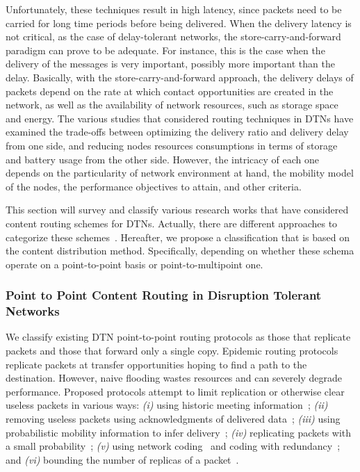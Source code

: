 Unfortunately, these techniques result in high latency, since packets need to be carried for long time periods before being delivered. When the delivery latency is not critical, as
the case of delay-tolerant networks, the store-carry-and-forward paradigm can prove to be adequate. For instance, this is the case when the delivery of the messages is very important, possibly more important than the delay. Basically, with the store-carry-and-forward approach, the delivery delays of packets depend on the rate at which contact opportunities are created in the network, as well as the availability of network resources, such as storage space and energy. The various studies that considered routing techniques in DTNs have examined the trade-offs between optimizing the delivery ratio and delivery delay from one side, and reducing nodes resources consumptions in terms of storage and battery usage from the other side. However, the intricacy of each one depends on the particularity of network environment at hand, the mobility model of the nodes, the performance objectives to attain, and other criteria.

This section will survey and classify various research works that have considered content routing schemes for DTNs. Actually, there are different approaches to categorize these schemes~\cite{Ward:RoutingSurvey, DTNRoutingSurvey06}. Hereafter, we propose a classification that is based on the content distribution method. Specifically, depending on whether these schema operate on a point-to-point basis or point-to-multipoint one.

\subsubsection{Point to Point Content Routing in Disruption Tolerant Networks}

We classify existing DTN point-to-point routing protocols as those that replicate packets and those that forward only a
single copy. Epidemic routing protocols replicate packets at transfer opportunities hoping to find a path to the destination.
However, naive flooding wastes resources and can severely degrade performance. Proposed protocols attempt to limit
replication or otherwise clear useless packets in various ways: \emph{(i)} using historic meeting information~\cite{Wearable, MVRouting, Levine:MaxProp}; \emph{(ii)} removing useless packets using acknowledgments of delivered data~\cite{Levine:MaxProp}; \emph{(iii)} using probabilistic mobility information to infer
delivery~\cite{Haas:wdtn}; \emph{(iv)} replicating packets with a small probability~\cite{Tseng:broadcast}; \emph{(v)} using network coding~\cite{LeBoudec:wdtn} and coding with
redundancy~\cite{Fall:Sigcomm05}; and \emph{(vi)} bounding the number of replicas of a packet~\cite{Haas:wdtn,akis:wdtn,Vahdat:epidemic}.

